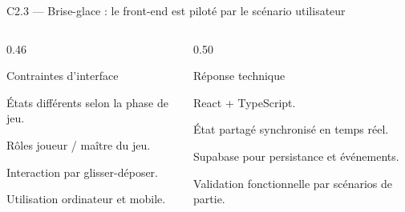 \begin{frame}{C2.3 — Brise-glace : le front-end est piloté par le scénario utilisateur}
\begin{columns}[T]
\begin{column}{0.46\linewidth}
\begin{block}{Contraintes d'interface}
\begin{tightitems}
  \item États différents selon la phase de jeu.
  \item Rôles joueur / maître du jeu.
  \item Interaction par glisser-déposer.
  \item Utilisation ordinateur et mobile.
\end{tightitems}
\end{block}
\end{column}
\begin{column}{0.50\linewidth}
\begin{block}{Réponse technique}
\begin{tightitems}
  \item React + TypeScript.
  \item État partagé synchronisé en temps réel.
  \item Supabase pour persistance et événements.
  \item Validation fonctionnelle par scénarios de partie.
\end{tightitems}
\end{block}
\end{column}
\end{columns}
\centering
{}
\end{frame}

